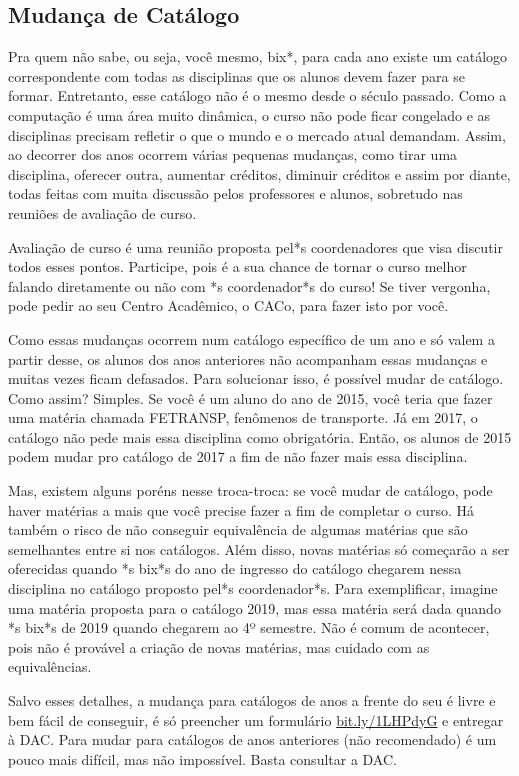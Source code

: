 \subsection{Mudança de Catálogo}

Pra quem não sabe, ou seja, você mesmo, bix*, para cada ano existe um catálogo
correspondente com todas as disciplinas que os alunos devem fazer para se
formar.  Entretanto, esse catálogo não é o mesmo desde o século passado. Como a
computação é uma área muito dinâmica, o curso não pode ficar congelado e as
disciplinas precisam refletir o que o mundo e o mercado atual demandam. Assim,
ao decorrer dos anos ocorrem várias pequenas mudanças, como tirar uma
disciplina, oferecer outra, aumentar créditos, diminuir créditos e assim por
diante, todas feitas com muita discussão pelos professores e alunos, sobretudo
nas reuniões de avaliação de curso.

Avaliação de curso é uma reunião proposta pel*s coordenadores que visa discutir
todos esses pontos. Participe, pois é a sua chance de tornar o curso melhor
falando diretamente ou não com *s coordenador*s do curso! Se tiver vergonha,
pode pedir ao seu Centro Acadêmico, o CACo, para fazer isto por você.

Como essas mudanças ocorrem num catálogo específico de um ano e só valem a
partir desse, os alunos dos anos anteriores não acompanham essas mudanças e
muitas vezes ficam defasados. Para solucionar isso, é possível mudar de
catálogo. Como assim? Simples. Se você é um aluno do ano de 2015, você teria
que fazer uma matéria chamada FETRANSP, fenômenos de transporte. Já em 2017, o
catálogo não pede mais essa disciplina como obrigatória. Então, os alunos de
2015 podem mudar pro catálogo de 2017 a fim de não fazer mais essa disciplina.

Mas, existem alguns poréns nesse troca-troca: se você mudar de catálogo, pode
haver matérias a mais que você precise fazer a fim de completar o curso. Há
também o risco de não conseguir equivalência de algumas matérias que são
semelhantes entre si nos catálogos. Além disso, novas matérias só começarão a
ser oferecidas quando *s bix*s do ano de ingresso do catálogo chegarem nessa
disciplina no catálogo proposto pel*s coordenador*s. Para exemplificar, imagine
uma matéria proposta para o catálogo 2019, mas essa matéria será dada quando
*s bix*s de 2019 quando chegarem ao 4º semestre. Não é comum de acontecer, pois
não é provável a criação de novas matérias, mas cuidado com as equivalências.

Salvo esses detalhes, a mudança para catálogos de anos a frente do seu é livre
e bem fácil de conseguir, é só preencher um formulário \url{bit.ly/1LHPdyG} e
entregar à DAC. Para mudar para catálogos de anos anteriores (não recomendado)
é um pouco mais difícil, mas não impossível. Basta consultar a DAC.


